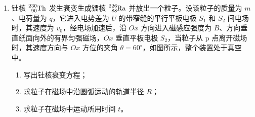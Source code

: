 \documentclass[\gkver]{gaokaozhenti}
\begin{document}
\begin{enumerate}
{（2）选 2，当开关接到左边接线柱时，并联电阻较小，通过电流较大，所以此时对应改装电流表的较大量程，接右边接线柱时并联两个电阻，阻值较大，通过电流较小，所以此时对应量程较小。不能选 3 是因为 3 中电路在通电状态下，更换量程会造成两分流电阻都未并联在表头两端，以致流过表头的电流超过其满偏电流而损坏。

（3）为了从零到量程范围进行一一校对所以要选择滑动变阻器的分压接法，让改装表和标准表同时测量电阻 $R_{0}$ 的电流，看读数是否相同来进行校对，所以电路图如图所示。
}

\item
钍核 $\ce{^{230}_{90}Th}$ 发生衰变生成镭核 $\ce{^{226}_{88}Ra}$ 并放出一个粒子。设该粒子的质量为 $m$、电荷量为 $q$，它进入电势差为 $U$ 的带窄缝的平行平板电极 $S_{1}$ 和 $S_{2}$ 间电场时，其速度为 $v_{0}$，经电场加速后，沿 $Ox$ 方向进入磁感应强度为 $B$、方向垂直纸面向外的有界匀强磁场，$Ox$ 垂直平板电极 $S_{2}$，当粒子从 p 点离开磁场时，其速度方向与 $Ox$ 方位的夹角 $\theta=60^{\circ}$，如图所示，整个装置处于真空中。
\begin{enumerate}
	\item
	写出钍核衰变方程；
	\item
	求粒子在磁场中沿圆弧运动的轨道半径 $R$；
	\item
	求粒子在磁场中运动所用时间 $t$。
\end{enumerate}
\end{enumerate}
\end{document}
